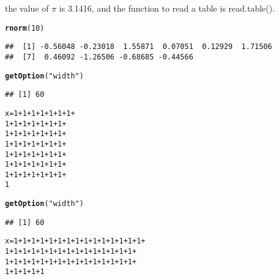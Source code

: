 \documentclass{article}\usepackage{graphicx, color}
\makeatletter
\newcommand{\hlfunctioncall}[1]{\textcolor[rgb]{0.501960784313725,0,0.329411764705882}{\textbf{#1}}}%
\newcommand{\hlstring}[1]{\textcolor[rgb]{0.6,0.6,1}{#1}}%
\newenvironment{kframe}{%
 \def\at@end@of@kframe{}%
 \ifinner\ifhmode%
  \def\at@end@of@kframe{\end{minipage}}%
  \begin{minipage}{\columnwidth}%
 \fi\fi%
 \def\FrameCommand##1{\hskip\@totalleftmargin \hskip-\fboxsep
 \colorbox{shadecolor}{##1}\hskip-\fboxsep
     \hskip-\linewidth \hskip-\@totalleftmargin \hskip\columnwidth}%
 \MakeFramed {\advance\hsize-\width
   \@totalleftmargin\z@ \linewidth\hsize
   \@setminipage}}%
 {\par\unskip\endMakeFramed%
 \at@end@of@kframe}
\newenvironment{knitrout}{}{} %
\makeatother
\begin{document}
the value of $\pi$ is 3.1416, and the function to read a table is read.table().

\begin{knitrout}
\color{fgcolor}\begin{kframe}
\begin{alltt}
\hlfunctioncall{rnorm}(10)
\end{alltt}
\begin{verbatim}
##  [1] -0.56048 -0.23018  1.55871  0.07051  0.12929  1.71506
##  [7]  0.46092 -1.26506 -0.68685 -0.44566
\end{verbatim}
\end{kframe}
\end{knitrout}

\begin{knitrout}
\color{fgcolor}\begin{kframe}
\begin{alltt}
\hlfunctioncall{getOption}(\hlstring{"width"})
\end{alltt}
\begin{verbatim}
## [1] 60
\end{verbatim}
\begin{alltt}
x = 1 + 1 + 1 + 1 + 1 + 1 + 1 + 
    1 + 1 + 1 + 1 + 1 + 1 + 1 + 
    1 + 1 + 1 + 1 + 1 + 1 + 1 + 
    1 + 1 + 1 + 1 + 1 + 1 + 1 + 
    1 + 1 + 1 + 1 + 1 + 1 + 1 + 
    1 + 1 + 1 + 1 + 1 + 1 + 1 + 
    1 + 1 + 1 + 1 + 1 + 1 + 1 + 
    1
\end{alltt}
\end{kframe}
\end{knitrout}

\begin{knitrout}
\color{fgcolor}\begin{kframe}
\begin{alltt}
\hlfunctioncall{getOption}(\hlstring{"width"})
\end{alltt}
\begin{verbatim}
## [1] 60
\end{verbatim}
\begin{alltt}
x = 1 + 1 + 1 + 1 + 1 + 1 + 1 + 1 + 1 + 1 + 1 + 1 + 1 + 1 + 1 + 
    1 + 1 + 1 + 1 + 1 + 1 + 1 + 1 + 1 + 1 + 1 + 1 + 1 + 1 + 1 + 
    1 + 1 + 1 + 1 + 1 + 1 + 1 + 1 + 1 + 1 + 1 + 1 + 1 + 1 + 1 + 
    1 + 1 + 1 + 1 + 1
\end{alltt}
\end{kframe}
\end{knitrout}
\end{document}
